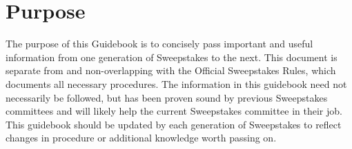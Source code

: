 \chapter{Purpose}

The purpose of this Guidebook is to concisely pass important and useful
information from one generation of Sweepstakes to the next. This document is
separate from and non-overlapping with the Official Sweepstakes Rules, which
documents all necessary procedures. The information in this guidebook need
not necessarily be followed, but has been proven sound by previous Sweepstakes
committees and will likely help the current Sweepstakes committee in their job.
\\
This guidebook should be updated by each generation of Sweepstakes to reflect
changes in procedure or additional knowledge worth passing on.
